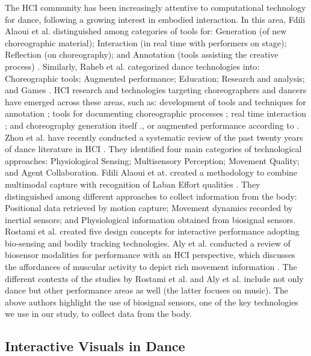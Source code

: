 The HCI community has been increasingly attentive to computational technology for dance, following a growing interest in embodied interaction. In this area, Fdili Alaoui et al. distinguished among categories of tools for: Generation (of new choreographic material); Interaction (in real time with performers on stage); Reflection (on choreography); and Annotation (tools assisting the creative process) \cite{fdili_alaoui_chiseling_2013}. Similarly, Raheb et al. categorized dance technologies into: Choreographic tools; Augmented performance; Education; Research and analysis; and Games  \cite{raheb_dance_2019}.  HCI research and technologies targeting choreographers and dancers have emerged across these areas, such as: development of tools and techniques for annotation \cite{cabral_multimodal_2011}; tools for documenting choreographic processes \cite{ciolfi_felice_knotation_2018,felice_studying_2021}; real time interaction \cite{fdili_alaoui_chiseling_2013}; and choreography generation itself \cite{calvert_evolution_1993}., or augmented performance according to \cite{raheb_dance_2019}. Zhou et al. have recently conducted a systematic review of the past twenty years of dance literature in HCI \cite{zhou_dance_2021}. They identified four main categories of technological approaches: Physiological Sensing; Multisensory Perception; Movement Quality; and Agent Collaboration. Fdili Alaoui et at. created a methodology to combine multimodal capture with recognition of Laban Effort qualities \cite{fdili_alaoui_seeing_2017}. They distinguished among different approaches to collect information from the body: Positional data retrieved by motion capture; Movement dynamics recorded by inertial sensors; and Physiological information obtained from biosignal sensors. Rostami et al. \cite{rostami_bio-sensed_2017} created five design concepts for interactive performance adopting bio-sensing and bodily tracking technologies. Aly et al. conducted a review of biosensor modalities for performance with an HCI perspective, which discusses the affordances of muscular activity to depict rich movement information \cite{aly_appropriating_2021}. The different contexts of the studies by Rostami et al. and Aly et al. include not only dance but other performance areas as well (the latter focuses on music). The above authors highlight the use of biosignal sensors, one of the key technologies we use in our study, to collect data from the body.

\subsection{Interactive Visuals in Dance}

